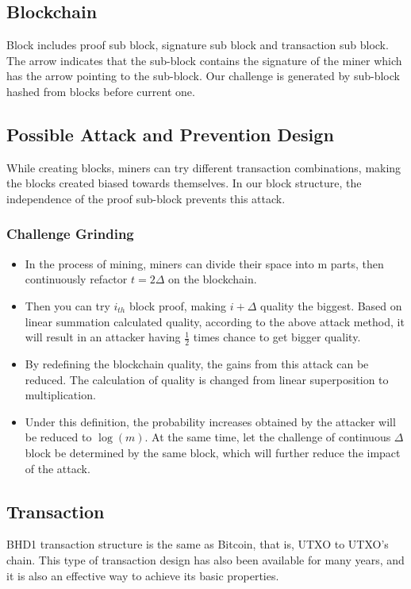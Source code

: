 \subsection{Blockchain}
\begin{flushleft}
    Block includes proof sub block, signature sub block and transaction sub block. The arrow indicates that the sub-block contains the signature of the miner which has the arrow pointing to the sub-block. Our challenge is generated by sub-block hashed from blocks before current one.
\end{flushleft}
\subsection{Possible Attack and Prevention Design}
\begin{flushleft}
    While creating blocks, miners can try different transaction combinations, making the blocks created biased towards themselves. In our block structure, the independence of the proof sub-block prevents this attack.
\end{flushleft}
\subsubsection{Challenge Grinding}
\begin{itemize}
    \item In the process of mining, miners can divide their space into m parts, then continuously refactor $t = 2\Delta$ on the blockchain.
    \item Then you can try $i_{th}$ block proof, making $i + \Delta$ quality the biggest. Based on linear summation calculated quality, according to the above attack method, it will result in an attacker having $\frac{1}{2}$ times chance to get bigger quality.
    \item By redefining the blockchain quality, the gains from this attack can be reduced. The calculation of quality is changed from linear superposition to multiplication.
    \item Under this definition, the probability increases obtained by the attacker will be reduced to $\log(m)$. At the same time, let the challenge of continuous $\Delta$ block be determined by the same block, which will further reduce the impact of the attack.
\end{itemize}
\subsection{Transaction}
\begin{flushleft}
    BHD1 transaction structure is the same as Bitcoin, that is, UTXO to UTXO's chain. This type of transaction design has also been available for many years, and it is also an effective way to achieve its basic properties.
\end{flushleft}

